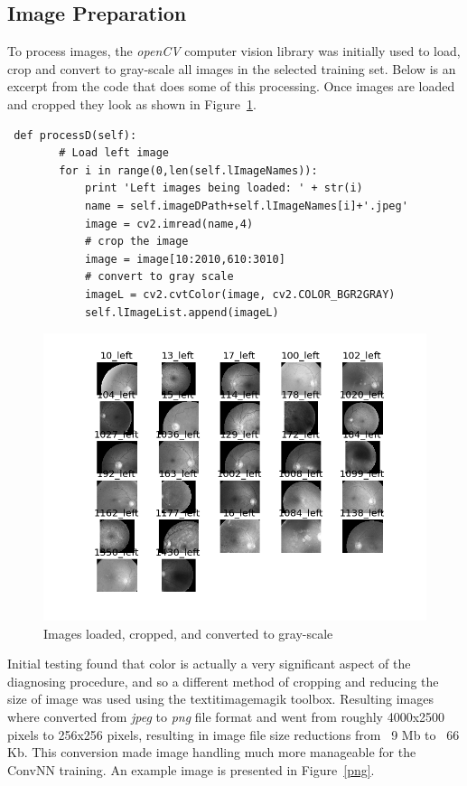 \documentclass[letterpaper,12pt]{article}
\newcommand{\figref}[1]{Figure~\ref{#1}}
\begin{document}
\subsection{Image Preparation}

To process images, the \textit{openCV} computer vision library was initially used to load, crop and convert to gray-scale all images in the selected training set. Below is an excerpt from the code that does some of this processing. Once images are loaded and cropped they look as shown in \figref{loaded}.

\begin{verbatim}
 def processD(self):
        # Load left image
        for i in range(0,len(self.lImageNames)):
            print 'Left images being loaded: ' + str(i)
            name = self.imageDPath+self.lImageNames[i]+'.jpeg'
            image = cv2.imread(name,4)
            # crop the image
            image = image[10:2010,610:3010]
            # convert to gray scale
            imageL = cv2.cvtColor(image, cv2.COLOR_BGR2GRAY)
            self.lImageList.append(imageL)
\end{verbatim}

\begin{figure}[htbp]
\begin{center}
\includegraphics[scale=0.5]{images/lInitialImages_gray.png}
\caption{Images loaded, cropped, and converted to gray-scale}
\label{loaded}
\end{center}
\end{figure}

Initial testing found that color is actually a very significant aspect of the diagnosing procedure, and so a different method of cropping and reducing the size of image was used using the textit{imagemagik} toolbox. Resulting images where converted from \textit{jpeg} to \textit{png} file format and went from roughly 4000x2500 pixels to 256x256 pixels, resulting in image file size reductions from ~9 Mb to ~66 Kb. This conversion made image handling much more manageable for the ConvNN training. An example image is presented in \figref{png}.
\end{document}
